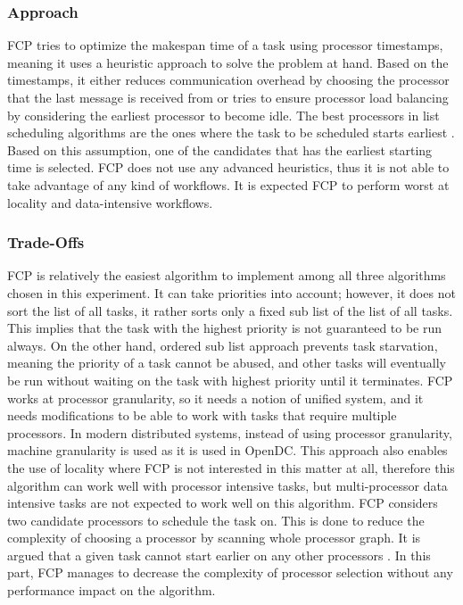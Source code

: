 \documentclass{article}
\begin{document}
\subsubsection{Approach}
FCP tries to optimize the makespan time of a task using processor timestamps, meaning it uses a heuristic approach to solve the problem at hand. Based on the timestamps, it either reduces communication overhead by choosing the processor that the last message is received from or tries to ensure processor load balancing by considering the earliest processor to become idle. The best processors in list scheduling algorithms are the ones where the task to be scheduled starts earliest \cite{Radulescu99onthe}. Based on this assumption, one of the candidates that has the earliest starting time is selected. FCP does not use any advanced heuristics, thus it is not able to take advantage of any kind of workflows. It is expected FCP to perform worst at locality and data-intensive workflows.
\subsubsection{Trade-Offs}
FCP is relatively the easiest algorithm to implement among all three algorithms chosen in this experiment. It can take priorities into account; however, it does not sort the list of all tasks, it rather sorts only a fixed sub list of the list of all tasks. This implies that the task with the highest priority is not guaranteed to be run always. On the other hand, ordered sub list approach prevents task starvation, meaning the priority of a task cannot be abused, and other tasks will eventually be run without waiting on the task with highest priority until it terminates.
FCP works at processor granularity, so it needs a notion of unified system, and it needs modifications to be able to work with tasks that require multiple processors. In modern distributed systems, instead of using processor granularity, machine granularity is used as it is used in OpenDC. This approach also enables the use of locality where FCP is not interested in this matter at all, therefore this algorithm can work well with processor intensive tasks, but multi-processor data intensive tasks are not expected to work well on this algorithm.
FCP considers two candidate processors to schedule the task on. This is done to reduce the complexity of choosing a processor by scanning whole processor graph. It is argued that a given task cannot start earlier on any other processors \cite{Radulescu99onthe}. In this part, FCP manages to decrease the complexity of processor selection without any performance impact on the algorithm.
\end{document}

